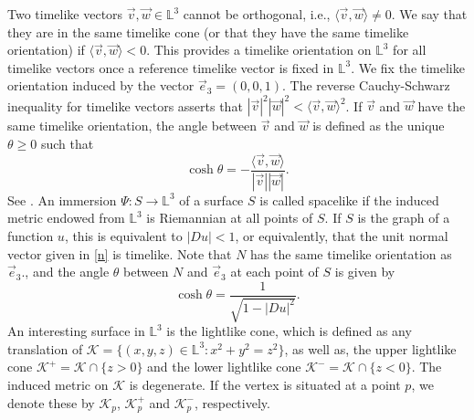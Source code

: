 \documentclass[a4paper,12pt]{amsart}
\theoremstyle{definition}
\def\l{\mathbb L}
\begin{document}
Two timelike vectors $\vec{v}, \vec{w}\in\l^3$ cannot be orthogonal, i.e., $\langle \vec{v},\vec{w}\rangle\not=0$. We say that they are in the same timelike cone (or that they have the same timelike orientation) if $\langle \vec{v},\vec{w}\rangle<0$. This provides a timelike orientation on $\l^3$ for  all timelike vectors once a reference timelike vector is fixed in $\l^3$. We fix the timelike orientation induced by the vector $\vec{e}_3=(0,0,1)$.  The reverse Cauchy-Schwarz inequality for timelike vectors asserts that $|\vec{v}|^2|\vec{w}|^2<\langle \vec{v},\vec{w}\rangle^2$. If $\vec{v}$ and $\vec{w}$ have the same timelike orientation, the angle between $\vec{v}$ and $\vec{w}$  is defined  as the    unique $\theta\geq 0$ such that 
$$\cosh\theta=-\frac{\langle \vec{v},\vec{w}\rangle}{|\vec{v}||\vec{w}|}.$$
See \cite{lo}. An   immersion $\Psi\colon S\to\l^3$ of a surface $S$ is called spacelike if the induced metric endowed from $\l^3$ is Riemannian at all   points of $S$. If $S$ is the graph of a function $u$, this is equivalent to $|Du|<1$, or equivalently, that  the unit normal vector   given in \eqref{n} is timelike. Note that  $N$ has the same timelike orientation as $\vec{e}_3$., and  the angle $\theta$ between $N$ and $\vec{e}_3$ at each point of $S$ is given by   
$$\cosh\theta=\frac{1}{\sqrt{1-|Du|^2}}.$$
An interesting surface   in $\l^3$ is the lightlike cone, which is defined as any translation of $\mathcal{K}=\{(x,y,z)\in\l^3\colon x^2+y^2=z^2\}$, as well as, the upper lightlike cone $\mathcal{K}^+=\mathcal{K}\cap\{z> 0\}$ and the lower lightlike cone $\mathcal{K}^-=\mathcal{K}\cap\{z< 0\}$. The   induced metric on $\mathcal{K}$ is degenerate. 
 If the vertex is situated at a point $p$, we denote these by  $\mathcal{K}_p$,   $\mathcal{K}^+_{p}$ and $\mathcal{K}^-_{p}$, respectively.
 
 
 
\end{document}
